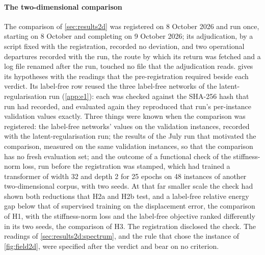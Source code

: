 \paragraph{The two-dimensional comparison}
The comparison of \cref{sec:results2d} was registered on 8 October 2026 and run once,
starting on 8 October and completing on 9 October 2026; its adjudication, by a script fixed
with the registration, recorded no deviation, and two operational departures recorded with
the run, the route by which its return was fetched and a log file renamed after the run,
touched no file that the adjudication reads.  gives its hypotheses with the
readings that the pre-registration required beside each verdict. Its label-free row reused
the three label-free networks of the latent-regularisation run (\ref{app:e1}): each was
checked against the SHA-256 hash that run had recorded, and evaluated again they reproduced
that run's per-instance validation values exactly. Three things were known when the
comparison was registered: the label-free networks' values on the validation instances,
recorded with the latent-regularisation run; the results of the July run that motivated the
comparison,
measured on the same validation instances, so that the comparison has no fresh evaluation
set; and the outcome of a functional check of the stiffness-norm loss, run before the
registration was stamped, which had trained a transformer of width 32 and depth 2 for 25
epochs on 48 instances of another two-dimensional corpus, with two seeds. At that far
smaller scale the check had shown both reductions that H2a and H2b test, and a label-free
relative energy gap below that of supervised training on the displacement error, the
comparison of H1, with the stiffness-norm loss and the label-free objective ranked
differently in its two seeds, the comparison of H3. The registration disclosed the check.
The readings of \cref{sec:results2d:spectrum}, and the rule that chose the instance of
\cref{fig:field2d}, were specified after the verdict and bear on no criterion.



